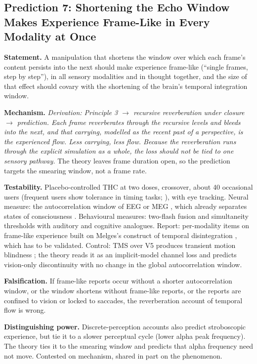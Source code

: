 \documentclass[12pt]{article}
\begin{document}
\subsection{Prediction 7: Shortening the Echo Window Makes Experience Frame-Like in Every Modality at Once}

\textbf{Statement.} A manipulation that shortens the window over which each frame's content persists into the next should make experience frame-like (``single frames, step by step''), in all sensory modalities and in thought together, and the size of that effect should covary with the shortening of the brain's temporal integration window.

\textbf{Mechanism.} \emph{Derivation: Principle 3 $\rightarrow$ recursive reverberation under closure $\rightarrow$ prediction. Each frame reverberates through the recursive levels and bleeds into the next, and that carrying, modelled as the recent past of a perspective, is the experienced flow. Less carrying, less flow. Because the reverberation runs through the explicit simulation as a whole, the loss should not be tied to one sensory pathway.} The theory leaves frame duration open, so the prediction targets the smearing window, not a frame rate.

\textbf{Testability.} Placebo-controlled THC at two doses, crossover, about 40 occasional users (frequent users show tolerance in timing tasks; \citealp{Sewell2013}), with eye tracking. Neural measure: the autocorrelation window of EEG or MEG \citep{Honey2012,Golesorkhi2021}, which already separates states of consciousness \citep{Huang2018,Zilio2021}. Behavioural measures: two-flash fusion and simultaneity thresholds \citep{SamahaPostle2015} with auditory and cognitive analogues. Report: per-modality items on frame-like experience built on Melges's construct of temporal disintegration \citep{Melges1970}, which has to be validated. Control: TMS over V5 produces transient motion blindness \citep{BeckersZeki1995}; the theory reads it as an implicit-model channel loss and predicts vision-only discontinuity with no change in the global autocorrelation window.

\textbf{Falsification.} If frame-like reports occur without a shorter autocorrelation window, or the window shortens without frame-like reports, or the reports are confined to vision or locked to saccades, the reverberation account of temporal flow is wrong.

\textbf{Distinguishing power.} Discrete-perception accounts \citep{VanRullen2016,Herzog2020} also predict stroboscopic experience, but tie it to a slower perceptual cycle (lower alpha peak frequency). The theory ties it to the smearing window and predicts that alpha frequency need not move. Contested on mechanism, shared in part on the phenomenon.
\end{document}
